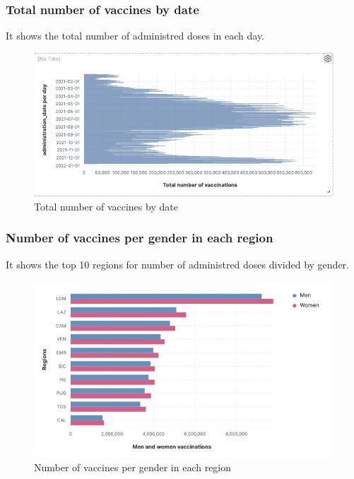 \documentclass[12pt, a4paper]{article}
\begin{document}
\subsubsection{Total number of vaccines by date}
It shows the total number of administred doses in each day.
\begin{figure}[H]
  \centering
  \includegraphics[width=1\linewidth]{img (12).png}
\caption*{Total number of vaccines by date}
\end{figure}

\subsubsection{Number of vaccines per gender in each region}
It shows the top 10 regions for number of administred doses divided by gender.
\begin{figure}[H]
  \centering
  \includegraphics[width=.9\linewidth]{img (14).png}
\caption*{Number of vaccines per gender in each region}
\end{figure}
\end{document}
